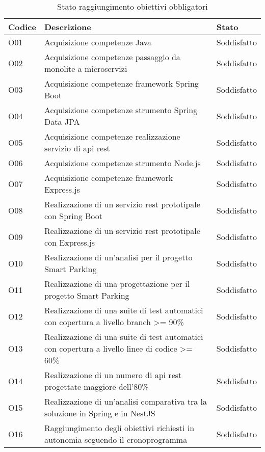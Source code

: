 \begin{table}[H]
    \begin{tabular}{|p{1.5cm}|p{7.7cm}|p{2cm}|} 
    \hline
    \textbf{Codice} & \textbf{Descrizione} & \textbf{Stato} \\ 
    \hline
    O01 & Acquisizione competenze Java & Soddisfatto \\
    \hline
    O02 & Acquisizione competenze passaggio da monolite a microservizi & Soddisfatto \\
    \hline
    O03 & Acquisizione competenze framework Spring Boot & Soddisfatto \\
    \hline
    O04 & Acquisizione competenze strumento Spring Data JPA & Soddisfatto \\
    \hline
    O05 & Acquisizione competenze realizzazione servizio di \gls{api} \gls{rest} & Soddisfatto \\
    \hline
    O06 & Acquisizione competenze strumento Node.js & Soddisfatto \\
    \hline
    O07 & Acquisizione competenze framework Express.js & Soddisfatto \\
    \hline
    O08 & Realizzazione di un servizio \gls{rest} prototipale con Spring Boot & Soddisfatto \\
    \hline
    O09 & Realizzazione di un servizio \gls{rest} prototipale con Express.js & Soddisfatto \\
    \hline
    O10 & Realizzazione di un'analisi per il progetto Smart Parking & Soddisfatto \\
    \hline
    O11 & Realizzazione di una progettazione per il progetto Smart Parking & Soddisfatto \\
    \hline
    O12 & Realizzazione di una suite di test automatici con copertura a livello branch >= 90\% & Soddisfatto \\
    \hline
    O13 & Realizzazione di una suite di test automatici con copertura a livello linee di codice >= 60\% & Soddisfatto \\
    \hline
    O14 & Realizzazione di un numero di \gls{api} \gls{rest} progettate maggiore dell'80\% & Soddisfatto \\
    \hline
    O15 & Realizzazione di un'analisi comparativa tra la soluzione in Spring e in NestJS & Soddisfatto \\
    \hline
    O16 & Raggiungimento degli obiettivi richiesti in autonomia seguendo il cronoprogramma & Soddisfatto \\
    \hline
    \end{tabular}
    \caption{Stato raggiungimento obiettivi obbligatori}
\end{table}
